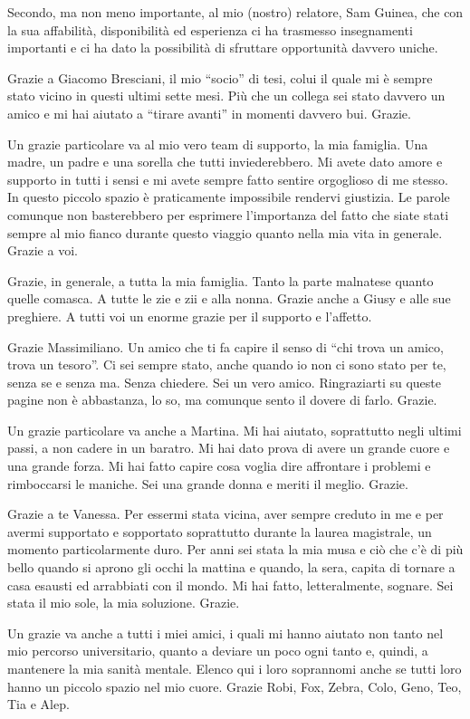 Secondo, ma non meno importante, al mio (nostro) relatore, Sam Guinea, che con la sua affabilità, disponibilità ed esperienza ci ha trasmesso insegnamenti importanti e ci ha dato la possibilità di sfruttare opportunità davvero uniche.

Grazie a Giacomo Bresciani, il mio ``socio'' di tesi, colui il quale mi è sempre stato vicino in questi ultimi sette mesi. Più che un collega sei stato davvero un amico e mi hai aiutato a ``tirare avanti'' in momenti davvero bui. Grazie.

Un grazie particolare va al mio vero team di supporto, la mia famiglia. Una madre, un padre e una sorella che tutti inviederebbero. Mi avete dato amore e supporto in tutti i sensi e mi avete sempre fatto sentire orgoglioso di me stesso. In questo piccolo spazio è praticamente impossibile rendervi giustizia. Le parole comunque non basterebbero per esprimere l'importanza del fatto che siate stati sempre al mio fianco durante questo viaggio quanto nella mia vita in generale. Grazie a voi.

Grazie, in generale, a tutta la mia famiglia. Tanto la parte malnatese quanto quelle comasca. A tutte le zie e zii e alla nonna. Grazie anche a Giusy e alle sue preghiere. A tutti voi un enorme grazie per il supporto e l'affetto.

Grazie Massimiliano. Un amico che ti fa capire il senso di ``chi trova un amico, trova un tesoro''. Ci sei sempre stato, anche quando io non ci sono stato per te, senza se e senza ma. Senza chiedere. Sei un vero amico. Ringraziarti su queste pagine non è abbastanza, lo so, ma comunque sento il dovere di farlo. Grazie.

Un grazie particolare va anche a Martina. Mi hai aiutato, soprattutto negli ultimi passi, a non cadere in un baratro. Mi hai dato prova di avere un grande cuore e una grande forza. Mi hai fatto capire cosa voglia dire affrontare i problemi e rimboccarsi le maniche. Sei una grande donna e meriti il meglio. Grazie.

Grazie a te Vanessa. Per essermi stata vicina, aver sempre creduto in me e per avermi supportato e sopportato soprattutto durante la laurea magistrale, un momento particolarmente duro. Per anni sei stata la mia musa e ciò che c'è di più bello quando si aprono gli occhi la mattina e quando, la sera, capita di tornare a casa esausti ed arrabbiati con il mondo. Mi hai fatto, letteralmente, sognare. Sei stata il mio sole, la mia soluzione. Grazie.

Un grazie va anche a tutti i miei amici, i quali mi hanno aiutato non tanto nel mio percorso universitario, quanto a deviare un poco ogni tanto e, quindi, a mantenere la mia sanità mentale. Elenco qui i loro soprannomi anche se tutti loro hanno un piccolo spazio nel mio cuore. Grazie Robi, Fox, Zebra, Colo, Geno, Teo, Tia e Alep.

